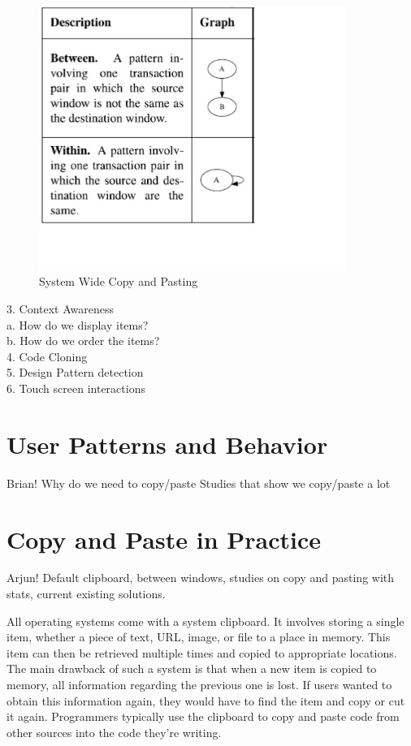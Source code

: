 \documentclass{acm_proc_article-sp}
\begin{document}
 \begin{figure}[h]
 \centering
\includegraphics[width=10cm]{Window}
\caption{System Wide Copy and Pasting}
    \label{fig:System}
\end{figure}
3. Context Awareness\\
    a. How do we display items?\\
    b. How do we order the items?\\
4. Code Cloning   \\
5. Design Pattern detection\\ 
6. Touch screen interactions\\

\section{User Patterns and Behavior}
Brian!
Why do we need to copy/paste
Studies that show we copy/paste a lot

\section{Copy and Paste in Practice}
Arjun!
Default clipboard, between windows, studies on copy and pasting with stats, current existing solutions.

All operating systems come with a system clipboard. It involves storing a single item, whether a piece of text, URL, image, or file to a place in memory. This item can then be retrieved multiple times and copied to appropriate locations. The main drawback of such a system is that when a new item is copied to memory, all information regarding the previous one is lost. If users wanted to obtain this information again, they would have to find the item and copy or cut it again. Programmers typically use the  clipboard to copy and paste code from other sources into the code they're writing.~\cite{codeReuse}
\end{document}
